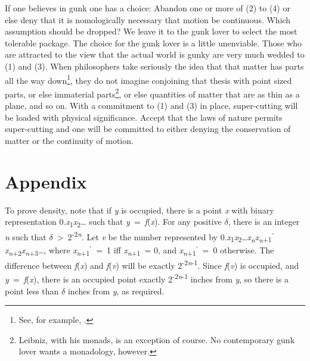 If one believes in gunk one has a choice: Abandon one or more of (2) to (4) or else deny that it is nomologically necessary that motion be continuous. Which assumption should be dropped? We leave it to the gunk lover to select the most tolerable package. The choice for the gunk lover is a little unenviable. Those who are attracted to the view that the actual world is gunky are very much wedded to (1) and (3). When philosophers take seriously the idea that that matter has parts all the way down\footnote{See, for example, \citet{Zimmerman1996}.}, they do not imagine conjoining that thesis with point sized parts, or else immaterial parts\footnote{Leibniz, with his monads, is an exception of course. No contemporary gunk lover wants a monadology, however. }, or else quantities of matter that are as thin as a plane, and so on.  With a commitment to (1) and (3) in place, super-cutting will be loaded with physical significance. Accept that the laws of nature permits super-cutting and one will be committed to either denying the conservation of matter or the continuity of motion. 

\section*{Appendix }

To prove density, note that if \textit{y} is occupied, there is a point \textit{x} with binary representation 0.\textit{x}\textsubscript{1}\textit{x}\textsubscript{2}{\dots} such that \textit{y}~=~\textit{f}(\textit{x}). For any positive ${\delta}$, there is an integer \textit{n} such that ${\delta}$~{\textgreater}~2\textsuperscript{{}-2}\textit{\textsuperscript{n}}\textsuperscript{}. Let \textit{v} be the number represented by 0.\textit{x}\textsubscript{1}\textit{x}\textsubscript{2}{\dots}\textit{x}\textit{\textsubscript{n}}\textit{x}\textit{\textsubscript{n}}\textsubscript{+1}\(^\prime\)\textit{x}\textit{\textsubscript{n}}\textsubscript{+2}\textit{x}\textit{\textsubscript{n}}\textsubscript{+3}{\dots}, where \textit{x}\textit{\textsubscript{n}}\textsubscript{+1}\(^\prime\)~=~1 iff \textit{x}\textit{\textsubscript{n}}\textsubscript{+1}~= 0, and \textit{x}\textit{\textsubscript{n}}\textsubscript{+1}\(^\prime\)~=~0 otherwise. The difference between \textit{f}(\textit{x}) and \textit{f}(\textit{v}) will be exactly 2\textsuperscript{{}-2}\textit{\textsuperscript{n}}\textsuperscript{{}-1}. Since \textit{f}(\textit{v}) is occupied, and \textit{y}~=~\textit{f}(\textit{x}), there is an occupied point exactly 2\textsuperscript{{}-2}\textit{\textsuperscript{n}}\textsuperscript{{}-1} inches from \textit{y}, so there is a point less than ${\delta}$ inches from \textit{y}, as required.

